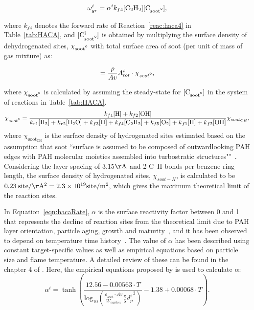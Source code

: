 \begin{equation}
	\omega^i_{gr} = \alpha^i k_{f4} [\mathrm{C_2H_2}][\mathrm{C_{soot\mbox{\textdegree}}}]
	\label{eqn:hacaRate},
\end{equation}

\noindent where ${k_{f4}}$ denotes the forward rate of Reaction~\ref{reac:haca4} in Table~\ref{tab:HACA}, and $\mathrm{[C^i_{soot\mbox{\textdegree}}]}$ is obtained by multiplying the surface density of dehydrogenated sites, $\mathrm{\chi_{soot\mbox{\textdegree}}}$ with total surface area of soot (per unit of mass of gas mixture) as:

\begin{equation}
	[\mathrm{C^i_{soot\mbox{\textdegree}}}] = \frac{\rho}{Av}A^i_{tot}\cdot\chi_{soot\mbox{\textdegree}}
	\label{eqn:csoot0},
\end{equation}

\noindent where $\mathrm{\chi_{soot\mbox{\textdegree}}}$ is calculated by assuming the steady-state for $\mathrm{[C_{soot\mbox{\textdegree}}]}$ in the system of reactions in Table~\ref{tab:HACA}.
\begin{equation}
	\chi_{soot\mbox{\textdegree}} = 
	\frac
	{k_{f1}[\mathrm{H}]+k_{f2}[\mathrm{OH}]}
	{k_{r1}[\mathrm{H_2}]+k_{r2}[\mathrm{H_2O}]+k_{f3}[\mathrm{H}]+k_{f4}[\mathrm{C_2H_2}]+k_{f5}[\mathrm{O_2}]+k_{f1}[\mathrm{H}]+k_{f2}[\mathrm{OH}]} \chi_{soot_{CH}}
	\label{eqn:chisoot0},
\end{equation}
\noindent where $\mathrm{\chi_{soot_{CH}}}$ is the surface density of hydrogenated sites estimated based on the assumption that soot ``surface is assumed to be composed of outwardlooking PAH edges with PAH molecular moieties assembled into turbostratic structures""~\citep{frenklach2019new}. Considering the layer spacing of 3.15$\mathrm{\AA}$ and 2 C–H bonds per benzene ring length, the surface density of hydrogenated sites, $\chi_{{soot}-H}$, is calculated to be $0.23\:\mathrm{site/\AA^2}=2.3\times10^{19} \mathrm{site/m^2}$, which gives the maximum theoretical limit of the reaction sites.

In Equation~\eqref{eqn:hacaRate}, $\alpha$ is the surface reactivity factor between 0 and 1 that represents the decline of reaction sites from the theoretical limit due to PAH layer orientation, particle aging, growth and maturity~\citep{haynes1982surface, harris1985chemical}, and it has been observed to depend on temperature time history~\cite{homann1985formation, dasch1985decay}. The value of $\alpha$ has been described using constant target-specific values as well as empirical equations based on particle size and flame temperature. A detailed review of these can be found in the chapter 4 of \citep{veshkini2015understanding}.  Here, the empirical equations proposed by \citet{appel2000kinetic} is used to calculate $\mathrm{\alpha}$:
\begin{equation}
	\alpha^i = \tanh 
	\left(
	\frac{12.56 - 0.00563\cdot T}
	{\mbox{log}_{10}
		\left( \frac{\rho_{soot}\cdot Av}{W_{carbon}} \frac{\pi}{6}{d^i_p}^3 \right) } -1.38+0.00068\cdot T
	\right)
	\label{eqn:alpha}.
\end{equation}

